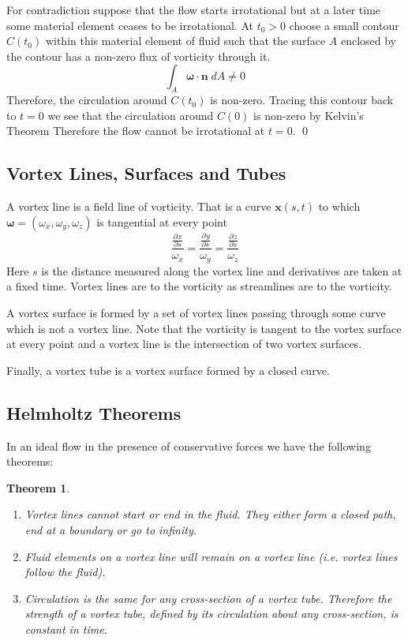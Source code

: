 \documentclass[11pt]{article}
\newcommand*{\pd}[3][]{\ensuremath{\frac{\partial^{#1} {#2}}{\partial {#3}^{#1}}}}
\newcommand{\mv}[1]{\bm{#1}}
\newcommand{\mdf}[1]{{\color{red}#1}}
\renewenvironment{proof}{{\bfseries Proof}}{\qed}
\newtheorem{theorem}{Theorem}[section]
\newenvironment{defin}
	{\begin{mdframed}[backgroundcolor=white, roundcorner=5pt, linewidth=1pt]
		\setlength{\parindent}{0pt}
		}
	{\end{mdframed}}
\begin{document}
\begin{proof}
For contradiction suppose that the flow starts irrotational but at a later time some material element ceases to be irrotational.
At $t_0 >0$ choose a small contour $C(t_0)$ within this material element of fluid such that the surface $A$ enclosed by the contour has a non-zero flux of vorticity through it.
\[
	\int_A \mv{\omega}\cdot\mv{n} \; dA\neq 0
\]
Therefore, the circulation around $C(t_0)$ is non-zero.
Tracing this contour back to $t=0$ we see that the circulation around $C(0)$ is non-zero by Kelvin's Theorem
Therefore the flow cannot be irrotational at $t=0$.
\end{proof}

\subsection{Vortex Lines, Surfaces and Tubes}
\begin{defin}
	A \mdf{vortex line} is a field line of vorticity. That is a curve $\mv{x}(s, t)$ to which $\mv{\omega}=(\omega_x, \omega_y, \omega_z)$ is tangential at every point
	\[
		\frac{\pd{x}{s}}{\omega_x}=\frac{\pd{y}{s}}{\omega_y}=\frac{\pd{z}{s}}{\omega_z}
	\]
	Here $s$ is the distance measured along the vortex line and derivatives are taken at a fixed time.
	Vortex lines are to the vorticity as streamlines are to the vorticity.

	A \mdf{vortex surface} is formed by a set of vortex lines passing through some curve which is not a vortex line.
	Note that the vorticity is tangent to the vortex surface at every point and a vortex line is the intersection of two vortex surfaces.

	Finally, a \mdf{vortex tube} is a vortex surface formed by a closed curve.
\end{defin}

\subsection{Helmholtz Theorems}
In an ideal flow in the presence of conservative forces we have the following theorems:

\begin{theorem}
\begin{enumerate}
	\item Vortex lines cannot start or end in the fluid. 
		They either form a closed path, end at a boundary or go to infinity.
	\item Fluid elements on a vortex line will remain on a vortex line (i.e. vortex lines follow the fluid).
	\item Circulation is the same for any cross-section of a vortex tube.
		Therefore the \mdf{strength of a vortex tube}, defined by its circulation about any cross-section, is constant in time.
\end{enumerate}
\end{theorem}
\end{document}
